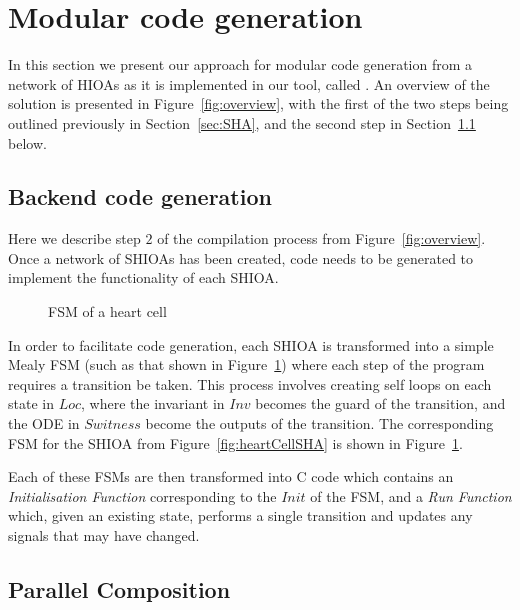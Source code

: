 \section{Modular code generation}
\label{sec:codeGen}

In this section we present our approach for modular code generation from
a network of \acp{HIOA} as it is implemented in our tool, called
\ourTool.  An overview of the solution is presented in
Figure~\ref{fig:overview}, with the first of the two steps being
outlined previously in Section~\ref{sec:SHA}, and the second step in
Section~\ref{sec:backendCodeGeneration} below.


\subsection{Backend code generation}
\label{sec:backendCodeGeneration}

Here we describe step $2$ of the compilation process from
Figure~\ref{fig:overview}. Once a network of \acp{SHIOA} has been
created, code needs to be generated to implement the functionality of
each \ac{SHIOA}.

\begin{figure}
  \centering
  
  \caption{\acf{FSM} of a heart cell \label{fig:heartCellFSM}}
\end{figure}

In order to facilitate code generation, each \ac{SHIOA} is transformed
into a simple Mealy \ac{FSM} (such as that shown in
Figure~\ref{fig:heartCellFSM}) where each step of the program requires a
transition be taken.  This process involves creating self loops on each
state in $Loc$, where the invariant in $Inv$ becomes the guard of the
transition, and the \acs{ODE} in $Switness$ become the outputs of the
transition.  The corresponding \ac{FSM} for the \ac{SHIOA} from
Figure~\ref{fig:heartCellSHA} is shown in Figure~\ref{fig:heartCellFSM}.

Each of these \acp{FSM} are then transformed into C code which contains
an \emph{Initialisation Function} corresponding to the $Init$ of the
\ac{FSM}, and a \emph{Run Function} which, given an existing state,
performs a single transition and updates any signals that may have
changed.


\subsection{Parallel Composition}
\label{sec:composition}


